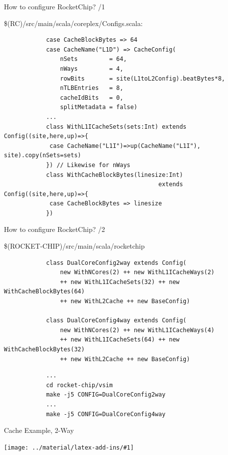 \documentclass[]{beamer} %
\newcommand*{\COMPILEIMAGES}{}%
\newcommand\inputimage[1]{%
	\ifdefined\COMPILEIMAGES
		
	\else
		\texttt{[image: ../material/latex-add-ins/\#1]}
	\fi
	}
\newenvironment{fullpage}[0]{%
	\begin{list}{}{%
		\setlength{\leftmargin}{-7mm}%
		\setlength{\rightmargin}{-7mm}%
		\vspace*{-10pt}
		}%
\item[]}{\end{list}}
\begin{document}
\begin{frame}[fragile]{How to configure RocketChip? /1}
	\begin{fullpage}
		\$(RC)/src/main/scala/coreplex/Configs.scala:
		\begin{verbatim}
			case CacheBlockBytes => 64
			case CacheName("L1D") => CacheConfig(
				nSets         = 64,
				nWays         = 4,
				rowBits       = site(L1toL2Config).beatBytes*8,
				nTLBEntries   = 8,
				cacheIdBits   = 0,
				splitMetadata = false)
			...
			class WithL1ICacheSets(sets:Int) extends Config((site,here,up)=>{
			 case CacheName("L1I")=>up(CacheName("L1I"), site).copy(nSets=sets)
			}) // Likewise for nWays
			class WithCacheBlockBytes(linesize:Int)
											extends Config((site,here,up)=>{
			 case CacheBlockBytes => linesize
			})
		\end{verbatim}
	\end{fullpage}
\end{frame}

\begin{frame}[fragile]{How to configure RocketChip? /2}
	\begin{fullpage}
	\$(ROCKET-CHIP)/src/main/scala/rocketchip
		\begin{verbatim}
			class DualCoreConfig2way extends Config(
				new WithNCores(2) ++ new WithL1ICacheWays(2)
				++ new WithL1ICacheSets(32) ++ new WithCacheBlockBytes(64)
				++ new WithL2Cache ++ new BaseConfig)

			class DualCoreConfig4way extends Config(
				new WithNCores(2) ++ new WithL1ICacheWays(4)
				++ new WithL1ICacheSets(64) ++ new WithCacheBlockBytes(32)
				++ new WithL2Cache ++ new BaseConfig)
		\end{verbatim}
		\pause
		\begin{verbatim}
			...
			cd rocket-chip/vsim
			make -j5 CONFIG=DualCoreConfig2way
			...
			make -j5 CONFIG=DualCoreConfig4way
		\end{verbatim}
	\end{fullpage}
\end{frame}

\begin{frame}{Cache Example, 2-Way}
	\begin{fullpage}
		\fourwayfalse
		\inputimage{image1}
	\end{fullpage}
\end{frame}
\end{document}
